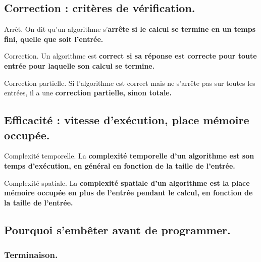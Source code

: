 \documentclass[french, 11pt]{article}
\begin{document}
\subsection{Correction : critères de vérification.}

\begin{defi}{Arrêt.}{}
    On dit qu'un algorithme s'\bf{arrête} si le calcul se termine en un temps fini, quelle que soit l'entrée.
\end{defi}

\begin{defi}{Correction.}{}
    Un algorithme est \bf{correct} si sa réponse est correcte pour toute entrée pour laquelle son calcul se termine.
\end{defi}

\begin{defi}{Correction partielle.}{}
    Si l'algorithme est correct mais ne s'arrête pas sur toutes les entrées, il a une \bf{correction partielle}, sinon \bf{totale}.
\end{defi}

\subsection{Efficacité : vitesse d'exécution, place mémoire occupée.}

\begin{defi}{Complexité temporelle.}{}
    La \bf{complexité temporelle} d'un algorithme est son temps d'exécution, en général en fonction de la taille de l'entrée.
\end{defi}

\vspace*{-0.3cm}

\begin{defi}{Complexité spatiale.}{}
    La \bf{complexité spatiale} d'un algorithme est la place mémoire occupée en plus de l'entrée pendant le calcul, en fonction de la taille de l'entrée.
\end{defi}

\subsection{Pourquoi s'embêter avant de programmer.}

\subsubsection{Terminaison.}
\end{document}
